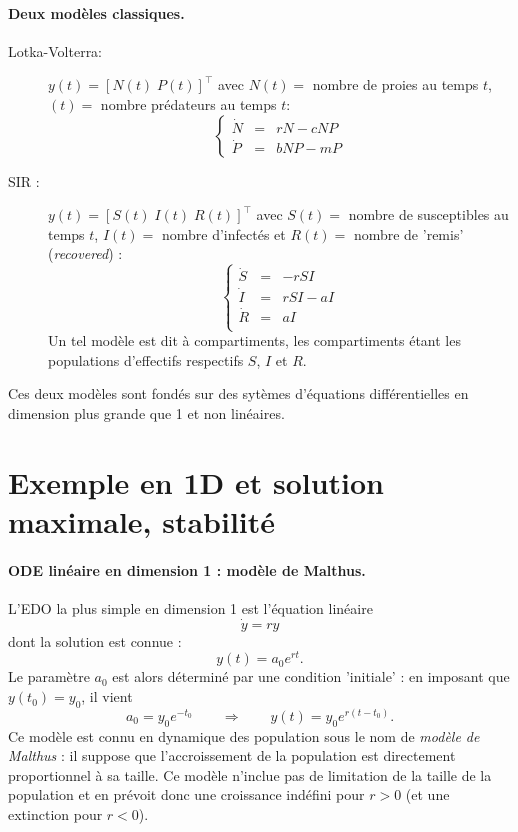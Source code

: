 \paragraph*{Deux modèles classiques.}
\begin{description}
 \item[Lotka-Volterra:] $y(t) = [N(t) \; P(t)]^\top$ avec $N(t) =$ nombre de proies au temps $t$, $(t) = $ nombre prédateurs au temps $t$:
 $$
 \left\{ \begin{array}{rcl} 
  \dot N & = & r N - c N P \\
  \dot P & = & b N P  - m P
 \end{array} \right.
 $$
 \item[SIR :] $y(t) = [S(t) \; I(t) \; R(t)]^\top$ avec $S(t) =$ nombre de susceptibles au temps $t$, $I(t) =$ nombre d'infectés et $R(t) =$ nombre de 'remis' ({\em recovered}) :
 $$
 \left\{ \begin{array}{rcl} 
  \dot S & = & - r S I \\
  \dot I & = & r S I - a I \\
  \dot R & = & a I \\
 \end{array} \right.
 $$
 Un tel modèle est dit à compartiments, les compartiments étant les populations d'effectifs respectifs $S$, $I$ et $R$. 
\end{description}

Ces deux modèles sont fondés sur des sytèmes d'équations différentielles en dimension plus grande que 1 et non linéaires.

\section{Exemple en 1D et solution maximale, stabilité} \label{sec:EquaDiff-1DsolMaximale}

\paragraph*{ODE linéaire en dimension 1 : modèle de Malthus.}
L'EDO la plus simple en dimension 1 est l'équation linéaire
$$
\dot y = r y
$$
dont la solution est connue : 
$$
y(t) = a_0 e^{rt}.
$$
Le paramètre $a_0$ est alors déterminé par une condition 'initiale' : en imposant que $y(t_0) = y_0$, il vient
$$
a_0 = y_0 e^{-t_0} 
\qquad \Rightarrow \qquad
y(t) = y_0 e^{r(t-t_0)}.
$$
Ce modèle est connu en dynamique des population sous le nom de {\em modèle de Malthus} : il suppose que l'accroissement de la population est directement proportionnel à sa taille. Ce modèle n'inclue pas de limitation de la taille de la population et en prévoit donc une croissance indéfini pour $r > 0$ (et une extinction pour $r < 0$).


